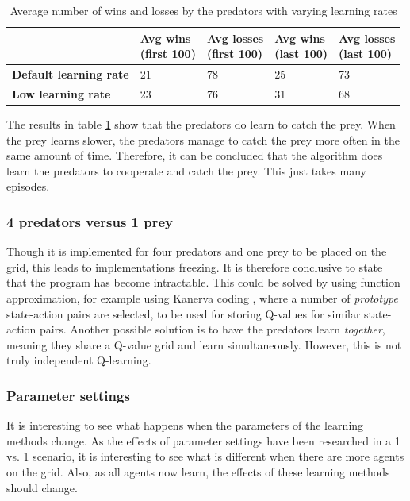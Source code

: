 \begin{table}[H]
\begin{center}
\begin{tabular}{| l | l | l | l | l |}
\hline
 & \parbox{2cm}{\textbf{Avg wins \\ (first 100)}} & \parbox{2cm}{\textbf{Avg losses \\ (first 100)}} & \parbox{2cm}{\textbf{Avg wins \\ (last 100)}} & \parbox{2cm}{\textbf{Avg losses \\ (last 100)}} \\
\hline
\textbf{Default learning rate} & 21 & 78 & 25 & 73 \\
\hline
\textbf{Low learning rate} & 23 & 76 & 31 & 68 \\
\hline
\end{tabular}
\caption{Average number of wins and losses by the predators with varying learning rates}
\label{table:3vs1}
\end{center}
\end{table}

The results in table \ref{table:3vs1} show that the predators do learn to catch the prey. When the prey learns slower, the predators manage to catch the prey more often in the same amount of time. Therefore, it can be concluded that the algorithm does learn the predators to cooperate and catch the prey. This just takes many episodes.

\subsubsection{4 predators versus 1 prey}
Though it is implemented for four predators and one prey to be placed on the grid, this leads to implementations freezing. It is therefore conclusive to state that the program has become intractable. This could be solved by using function approximation, for example using Kanerva coding \cite{wu2009function}, where a number of \textit{prototype} state-action pairs are selected, to be used for storing Q-values for similar state-action pairs. Another possible solution is to have the predators learn \textit{together}, meaning they share a Q-value grid and learn simultaneously. However, this is not truly independent Q-learning. 

\subsubsection{Parameter settings}
It is interesting to see what happens when the parameters of the learning methods change. As the effects of parameter settings have been researched in a 1 vs. 1 scenario, it is interesting to see what is different when there are more agents on the grid. Also, as all agents now learn, the effects of these learning methods should change.

